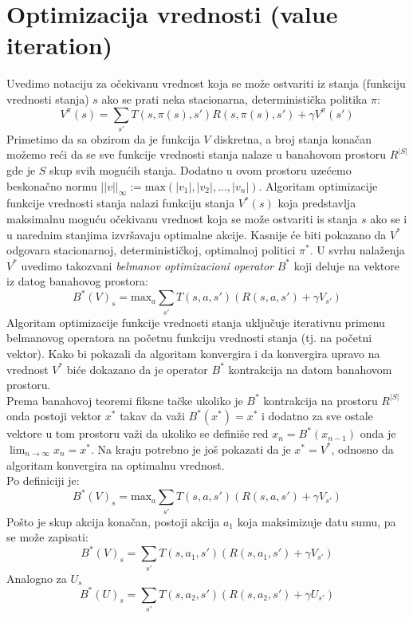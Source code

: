\documentclass[a4paper,fleqn,12pt]{JMThesis}
\newcommand{\latin}{\fontencoding{T1}\selectfont\selectlanguage{english}}
\theoremstyle{plain}
\theoremstyle{definition}
\newcommand{\piopt}{{\pi}^{*}}
\theoremstyle{definition}
\begin{document}
\section{Optimizacija vrednosti (\latin value iteration)}
Uvedimo notaciju za očekivanu vrednost koja se može ostvariti iz stanja (funkciju vrednosti stanja) $s$ ako se prati neka stacionarna, deterministička politika $\pi$:
\[
	V^{\pi}(s) = \sum_{s'}T(s,\pi(s),s')R(s,\pi(s),s') + \gamma V^{\pi}(s')
\]
Primetimo da sa obzirom da je funkcija $V$ diskretna, a broj stanja konačan možemo reći da se sve funkcije vrednosti stanja
nalaze u banahovom prostoru $R^{|S|}$ gde je $S$ skup svih mogućih stanja. Dodatno u ovom prostoru uzećemo beskonačno normu
$||v||_{\infty} := \text{max}(|v_{1}|,|v_{2}|,...,|v_{n}|)$.
Algoritam optimizacije funkcije vrednosti stanja nalazi funkciju stanja $V^{*}(s)$ koja predstavlja maksimalnu moguću
očekivanu vrednost koja se može ostvariti is stanja $s$ ako se i u narednim stanjima izvršavaju optimalne akcije.
Kasnije će biti pokazano da $V^{*}$ odgovara stacionarnoj, determinističkoj, optimalnoj politici $\piopt$.
U svrhu nalaženja $V^{*}$ uvedimo takozvani \textit{belmanov optimizacioni operator} $B^{*}$ koji deluje na vektore
iz datog banahovog prostora:
\[
	B^{*}(V)_s = \text{max}_{a}\sum_{s'}T(s,a,s')(R(s,a,s') + \gamma V_{s'})
\]
Algoritam optimizacije funkcije vrednosti stanja uključuje iterativnu primenu belmanovog operatora na 
početnu funkciju vrednosti stanja (tj. na početni vektor). Kako bi pokazali da algoritam konvergira i da konvergira upravo 
na vrednost $V^{*}$ biće dokazano da je operator $B^{*}$ kontrakcija na datom banahovom prostoru.\\ 
Prema banahovoj teoremi fiksne tačke ukoliko je $B^{*}$ kontrakcija na prostoru $R^{|S|}$ 
onda postoji vektor $x^*$ takav da važi $B^{*}(x^{*}) = x^{*}$ i dodatno za sve ostale vektore u tom prostoru 
važi da ukoliko se definiše red $x_n = B^{*}(x_{n-1})$ onda je $\lim_{n \to \infty} x_n = x^*$. Na kraju potrebno je
još pokazati da je $x^{*} = V^{*}$, odnosno da algoritam konvergira na optimalnu vrednost.
\teo{$(\forall U \in R^{|S|}, \forall V \in R^{|S|}, U \neq V ) ||B^*(V) - B^*(U)||_{\infty} \leq k ||V - U||_{\infty}$ gde $k \in [0,1)$}\\
Po definiciji je:
\[ B^*(V)_s = \text{max}_{a}\sum_{s'}T(s,a,s')(R(s,a,s')+\gamma V_{s'}) \]
Pošto je skup akcija konačan, postoji akcija $a_1$ koja maksimizuje datu sumu, pa se može zapisati:
\[	B^*(V)_s = \sum_{s'}T(s,a_1,s')(R(s,a_1,s')+\gamma V_{s'}) \]
Analogno za $U_s$
\[	B^*(U)_s = \sum_{s'}T(s,a_2,s')(R(s,a_2,s')+\gamma U_{s'}) \]
\end{document}
